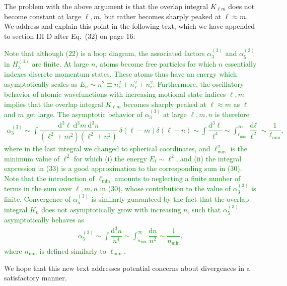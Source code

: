 \documentclass[preprint]{revtex4-1}
\renewcommand{\t}{\text} %
\newcommand{\f}{\dfrac} %
\newcommand{\p}[1]{\left(#1\right)} %
\renewcommand{\d}{\text{d}}
\newcommand{\x}{\text{x}}
\newcommand{\y}{\text{y}}
\newcommand{\z}{\text{z}}
\newcommand{\1}{\mathds{1}}
\newcommand{\green}[1]{\textcolor{green}{#1}}
\begin{document}
\begin{enumerate}
  The problem with the above argument is that the overlap integral
  $K_{\ell m}$ does not become constant at large $\ell,m$, but rather
  becomes sharply peaked at $\ell\approx m$.  We address and explain
  this point in the following text, which we have appended to section
  III D after Eq.~(32) on page 16:

  \green{Note that although (22) is a loop diagram, the associated
    factors $\alpha_3^{(3)}$ and $\alpha_5^{(3)}$ in $H_3^{(3)}$ are
    finite.  At large $n$, atoms become free particles for which $n$
    essentially indexes discrete momentum states.  These atoms thus
    have an energy which asymptotically scales as
    $E_n\sim n^2\equiv n_\x^2+n_\y^2+n_\z^2$.  Furthermore, the
    oscillatory behavior of atomic wavefunctions with increasing
    motional state indices $\ell,m$ implies that the overlap integral
    $K_{\ell m}$ becomes sharply peaked at $\ell\approx m$ as $\ell$
    and $m$ get large.  The asymptotic behavior of $\alpha_3^{(3)}$ at
    large $\ell,m,n$ is therefore
    \begin{align*}
      \alpha_3^{(3)}
      \sim \int \f{\d^3\ell~\d^3m~\d^3n}{\p{\ell^2+m^2}\p{\ell^2+n^2}}
      ~\delta\p{\ell-m}\delta\p{\ell-n}
      \sim \int \f{\d^3\ell}{\ell^4}
      \sim \int_{\ell_{\t{min}}}^\infty \f{\d\ell}{\ell^2}
      \sim \f1{\ell_{\t{min}}},
      \tag{33}
    \end{align*}
    where in the last integral we changed to spherical coordinates,
    and $\ell_{\t{min}}^2$ is the minimum value of $\ell^2$ for which
    (i) the energy $E_\ell\sim\ell^2$, and (ii) the integral
    expression in (33) is a good approximation to the corresponding
    sum in (30).  Note that the introduction of $\ell_{\t{min}}$
    amounts to neglecting a finite number of terms in the sum over
    $\ell,m,n$ in (30), whose contribution to the value of
    $\alpha_3^{(3)}$ is finite.  Convergence of $\alpha_5^{(3)}$ is
    similarly guaranteed by the fact that the overlap integral $K_n$
    does not asymptotically grow with increasing $n$, such that
    $\alpha_5^{(3)}$ asymptotically behaves as
    \begin{align*}
      \alpha_5^{(3)} \sim \int \f{\d^3 n}{n^4}
      \sim \int_{n_{\t{min}}}^\infty \f{\d n}{n^2}
      \sim \f1{n_{\t{min}}},
      \tag{34}
    \end{align*}
    where $n_{\t{min}}$ is defined similarly to $\ell_{\t{min}}$.}

  We hope that this new text addresses potential concerns about
  divergences in a satisfactory manner.



\end{enumerate}
\end{document}
